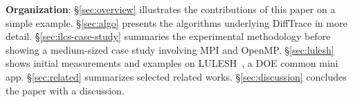 {\bf Organization\/}: 
%
\S\ref{sec:overview} illustrates the contributions of this paper on a simple example.
%
\S\ref{sec:algo} presents the algorithms underlying DiffTrace in more detail.
%
\S\ref{sec:ilcs-case-study} summaries the experimental methodology before showing a medium-sized case study involving MPI and OpenMP.
%
\S\ref{sec:lulesh} shows initial measurements and examples on LULESH~\cite{LULESH2:changes}, a DOE common mini app.
%
\S\ref{sec:related} summarizes selected related works.
%
\S\ref{sec:discussion} concludes the paper with a discussion.

% 
% 
% 
% 
% 





